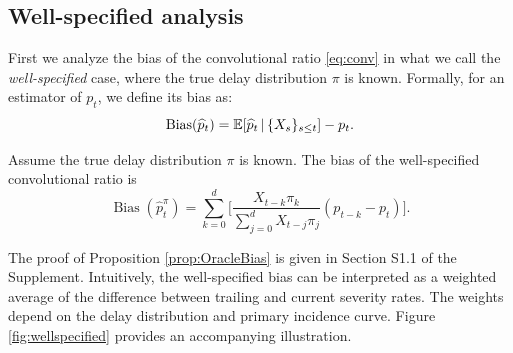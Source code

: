 \documentclass{article}
\renewcommand{\hat}{\widehat} %
\newcommand{\given}{\, \vert \,}
\DeclareMathOperator{\bias}{Bias}
\begin{document}
\subsection{Well-specified analysis}
\label{sec:wellspecified}

First we analyze the bias of the convolutional ratio \eqref{eq:conv} in what we  
call the \emph{well-specified} case, where the true delay distribution $\pi$ is 
known. Formally, for an estimator \smash{$\hat{p}_t$} of $p_t$, we define its
bias as:     
\[
\bias(\hat{p}_t) = \E[\hat{p}_t \given \{X_s\}_{s\leq t}] - p_t. 
\]

\begin{proposition}
\label{prop:OracleBias}
Assume the true delay distribution $\pi$ is known.
The bias of the well-specified convolutional ratio \smash{$\hat{p}_t^\pi$} is 
\begin{equation}
\label{eq:OracleBias}
\bias(\hat{p}_t^\pi)  = \sum_{k=0}^d \Bigg[ \frac{X_{t-k}\pi_k}{\sum_{j=0}^d
  X_{t-j}\pi_j} (p_{t-k}-p_t) \Bigg]. 
\end{equation}
\end{proposition}

The proof of Proposition \ref{prop:OracleBias} is given in
Section S1.1 of the Supplement. 
Intuitively, the well-specified bias can be interpreted as a weighted average of the difference between trailing and current severity rates. 
The weights depend on the delay distribution and primary incidence curve.
Figure \ref{fig:wellspecified} provides an accompanying illustration.     
\end{document}
